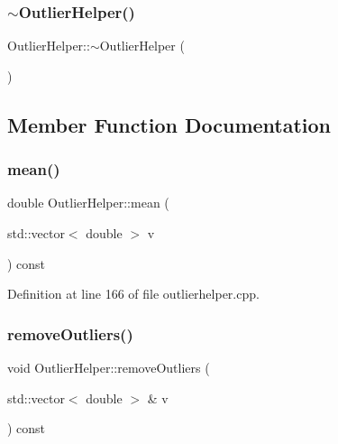 \mbox{\label{class_outlier_helper_abcdc45be935821173222cb6c960dfdeb}} 
\subsubsection{\texorpdfstring{$\sim$\+Outlier\+Helper()}{~OutlierHelper()}}
{\footnotesize\ttfamily Outlier\+Helper\+::$\sim$\+Outlier\+Helper (\begin{DoxyParamCaption}{ }\end{DoxyParamCaption})\hspace{0.3cm}{\ttfamily [default]}}



\subsection{Member Function Documentation}
\mbox{\label{class_outlier_helper_a15110f2e9b10b243ba072ca08accfc32}} 
\subsubsection{\texorpdfstring{mean()}{mean()}}
{\footnotesize\ttfamily double Outlier\+Helper\+::mean (\begin{DoxyParamCaption}\item[{std\+::vector$<$ double $>$}]{v }\end{DoxyParamCaption}) const}



Definition at line 166 of file outlierhelper.\+cpp.

\mbox{\label{class_outlier_helper_ac8d720064a0c39c9178417c5077cfa43}} 
\subsubsection{\texorpdfstring{remove\+Outliers()}{removeOutliers()}}
{\footnotesize\ttfamily void Outlier\+Helper\+::remove\+Outliers (\begin{DoxyParamCaption}\item[{std\+::vector$<$ double $>$ \&}]{v }\end{DoxyParamCaption}) const}



